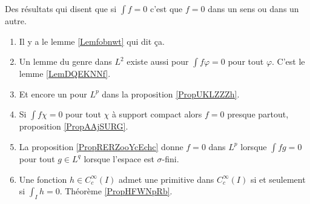 Des résultats qui disent que si \( \int f=0\) c'est que \( f=0\) dans un sens ou dans un autre.
\begin{enumerate}
    \item
        Il y a le lemme \ref{Lemfobnwt} qui dit ça.
    \item
        Un lemme du genre dans \( L^2\) existe aussi pour \( \int f\varphi=0\) pour tout \( \varphi\). C'est le lemme \ref{LemDQEKNNf}.
    \item
        Et encore un pour \( L^p\) dans la proposition \ref{PropUKLZZZh}.
    \item
        Si \( \int f\chi=0\) pour tout \( \chi\) à support compact alors \( f=0\) presque partout, proposition \ref{PropAAjSURG}.
    \item
        La proposition \ref{PropRERZooYcEchc} donne \( f=0\) dans \( L^p\) lorsque \( \int fg=0\) pour tout \( g\in L^q\) lorsque l'espace est \( \sigma\)-fini.
    \item
        Une fonction \( h\in C^{\infty}_c(I)\) admet une primitive dans \(  C^{\infty}_c(I)\) si et seulement si \( \int_Ih=0\). Théorème \ref{PropHFWNpRb}.
\end{enumerate}




